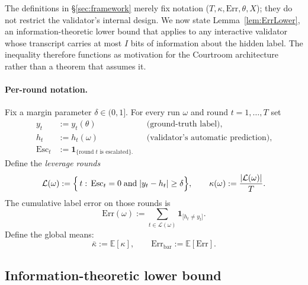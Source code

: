 \documentclass[11pt]{article}
\newcommand{\Err}{\mathrm{Err}}
\newcommand{\E}{\mathbb{E}}
\begin{document}
The definitions in \S\ref{sec:framework} merely fix notation
(\(T,\kappa,\Err,\theta,X\)); they do not restrict the validator's
internal design.  We now state Lemma~\ref{lem:ErrLower}, an
information-theoretic lower bound that applies to any interactive
validator whose transcript carries at most \(I\) bits of information
about the hidden label.  The inequality therefore functions as
motivation for the Courtroom architecture rather than a theorem
that assumes it.

\paragraph{Per-round notation.}
Fix a margin parameter $\delta\in(0,1]$.
For every run $\omega$ and round $t=1,\dots,T$ set
\begin{align*}
  y_t      &:=y_t(\theta)          &&\text{(ground-truth label)},\\
  h_t      &:=h_t(\omega)          &&\text{(validator's automatic prediction)},\\
  \mathrm{Esc}_t&:=\mathbf 1_{\{\text{round $t$ is escalated}\}.}
\end{align*}
Define the \emph{leverage rounds}
\begin{equation}\label{eq:kappaDef}
  \mathcal L(\omega):=\Bigl\{\,t:\,
     \mathrm{Esc}_t=0\;\text{and}\;|y_t-h_t|\ge\delta\Bigr\},
  \qquad
  \kappa(\omega):=\frac{|\mathcal L(\omega)|}{T}.
\end{equation}
The cumulative label error on those rounds is
\begin{equation}\label{eq:ErrDef}
  \Err(\omega):=\sum_{t\in\mathcal L(\omega)}
                \mathbf 1_{\!\bigl[h_t\neq y_t\bigr]}.
\end{equation}
Define the global means:
\[
  \bar\kappa:=\E[\kappa],
  \qquad
  \Err_{\mathrm{bar}}:=\E[\Err].
\]


\subsection{Information-theoretic lower bound}\label{sec:info-bound}
\end{document}
